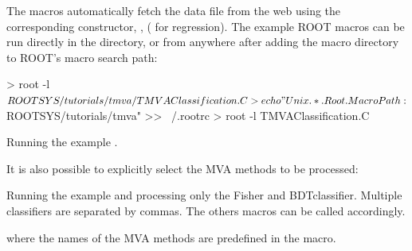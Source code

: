 The macros automatically fetch the data file from
the web using the corresponding  constructor, \eg,
 ( for regression). The example %
ROOT macros can be run directly in the \TmvaTutorialDir directory,
or from anywhere after adding the macro directory
to ROOT's macro search path:
\begin{codeexample}
\begin{tmvacode}
> root -l $ROOTSYS/tutorials/tmva/TMVAClassification.C
> echo "Unix.*.Root.MacroPath: $ROOTSYS/tutorials/tmva" >> ~/.rootrc
> root -l TMVAClassification.C
\end{tmvacode}
\caption[.]{\codeexampleCaptionSize Running the example .}
\end{codeexample}

It is also possible to explicitly select the MVA methods to be processed:
\begin{codeexample}
\caption[.]{\codeexampleCaptionSize Running the example  and processing only the Fisher and BDTclassifier. Multiple classifiers are separated by commas. The others macros can be called accordingly.}
\end{codeexample}
where the names of the MVA methods are predefined in the macro.


